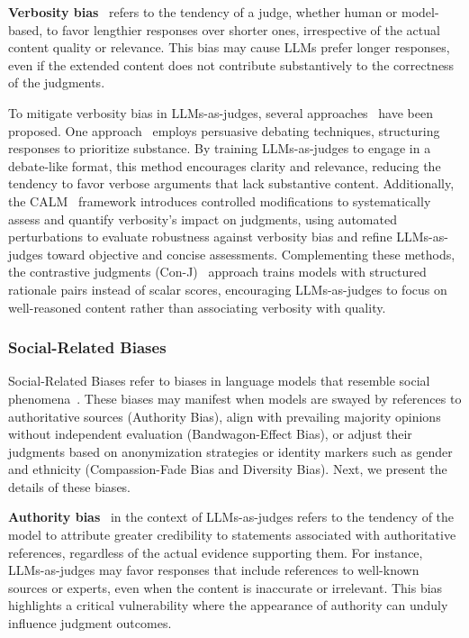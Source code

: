 \noindent\textbf{Verbosity bias}~\cite{khan2024debating,chen2024humans,zheng2023judging,nasrabadi2024juree} refers to the tendency of a judge, whether human or model-based, to favor lengthier responses over shorter ones, irrespective of the actual content quality or relevance. This bias may cause LLMs prefer longer responses, even if the extended content does not contribute substantively to the correctness of the judgments. 

To mitigate verbosity bias in LLMs-as-judges, several approaches~\cite{khan2024debating,ye2024justice,ye2024beyond} have been proposed. One approach~\cite{khan2024debating} employs persuasive debating techniques, structuring responses to prioritize substance. By training LLMs-as-judges to engage in a debate-like format, this method encourages clarity and relevance, reducing the tendency to favor verbose arguments that lack substantive content. Additionally, the CALM~\cite{ye2024justice} framework introduces controlled modifications to systematically assess and quantify verbosity’s impact on judgments, using automated perturbations to evaluate robustness against verbosity bias and refine LLMs-as-judges toward objective and concise assessments. Complementing these methods, the contrastive judgments (Con-J)~\cite{ye2024beyond} approach trains models with structured rationale pairs instead of scalar scores, encouraging LLMs-as-judges to focus on well-reasoned content rather than associating verbosity with quality. 




\subsubsection{Social-Related Biases} 
\label{sec:socialbiases}
Social-Related Biases refer to biases in language models that resemble social phenomena~\cite{zhao2023mind}. These biases may manifest when models are swayed by references to authoritative sources (Authority Bias), align with prevailing majority opinions without independent evaluation (Bandwagon-Effect Bias), or adjust their judgments based on anonymization strategies or identity markers such as gender and ethnicity (Compassion-Fade Bias and Diversity Bias). Next, we present the details of these biases.


\noindent\textbf{Authority bias}~\cite{chen2024humans,ye2024justice} in the context of LLMs-as-judges refers to the tendency of the model to attribute greater credibility to statements associated with authoritative references, regardless of the actual evidence supporting them. For instance, LLMs-as-judges may favor responses that include references to well-known sources or experts, even when the content is inaccurate or irrelevant. This bias highlights a critical vulnerability where the appearance of authority can unduly influence judgment outcomes.

